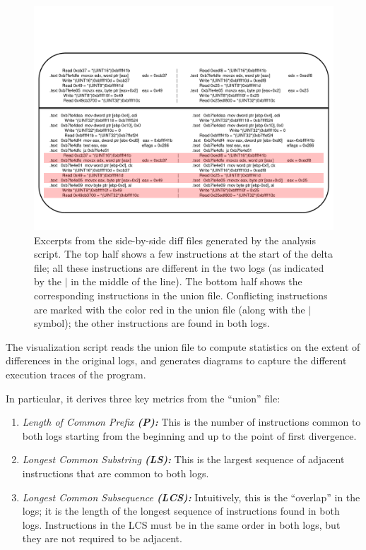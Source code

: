 \begin{figure}[h]
  \center
  \includegraphics[scale=0.64, trim=2cm 2cm 2cm 2cm]{log2.pdf}
  \caption[Excerpts from the side-by-side diff files generated by the analysis script]%
          {Excerpts from the side-by-side diff files generated by the analysis script.
            The top half shows a few instructions at the start of the delta file;
            all these instructions are different in the two logs (as
            indicated by the $\vert$ in the middle of the line).
            The bottom half shows the corresponding instructions in the union file.
            Conflicting instructions are marked with the color red in the 
            union file (along with the $\vert$ symbol); the other instructions are found in both logs.}
  \label{hw:logsys2}
\end{figure}

\newpage
{} \newline
The visualization script reads the union file to 
compute statistics on the extent of differences in the
original logs, and generates diagrams to 
capture the different execution traces of the program.
 
In particular, it derives three key metrics
from the ``union'' file:
\begin{enumerate}
\item {\em Length of Common Prefix {\bf (P):}} This is 
the number of instructions common
to both logs starting from the beginning
and up to the point of first divergence.
\item {\em Longest Common Substring {\bf (LS):}}
This is the largest sequence of adjacent instructions 
that are common to both logs.
\item {\em Longest Common Subsequence {\bf (LCS):}}
Intuitively, this is the ``overlap'' in the logs;
it is the length of the longest sequence of instructions
found in both logs. Instructions in the LCS must be in the same order
in both logs, but they are not required to be adjacent.
\end{enumerate}

